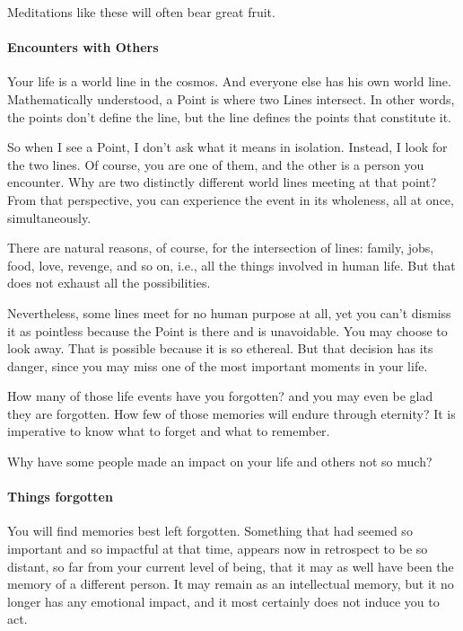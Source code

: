 Meditations like these will often bear great fruit.

\paragraph{Encounters with Others}
Your life is a world line in the cosmos. And everyone else has his own world line. Mathematically understood, a Point is where two Lines intersect. In other words, the points don't define the line, but the line defines the points that constitute it.

So when I see a Point, I don't ask what it means in isolation. Instead, I look for the two lines. Of course, you are one of them, and the other is a person you encounter. Why are two distinctly different world lines meeting at that point? From that perspective, you can experience the event in its wholeness, all at once, simultaneously.

There are natural reasons, of course, for the intersection of lines: family, jobs, food, love, revenge, and so on, i.e., all the things involved in human life. But that does not exhaust all the possibilities.

Nevertheless, some lines meet for no human purpose at all, yet you can't dismiss it as pointless because the Point is there and is unavoidable. You may choose to look away. That is possible because it is so ethereal. But that decision has its danger, since you may miss one of the most important moments in your life.

How many of those life events have you forgotten? and you may even be glad they are forgotten. How few of those memories will endure through eternity? It is imperative to know what to forget and what to remember.

Why have some people made an impact on your life and others not so much?

\paragraph{Things forgotten}
You will find memories best left forgotten. Something that had seemed so important and so impactful at that time, appears now in retrospect to be so distant, so far from your current level of being, that it may as well have been the memory of a different person. It may remain as an intellectual memory, but it no longer has any emotional impact, and it most certainly does not induce you to act.



